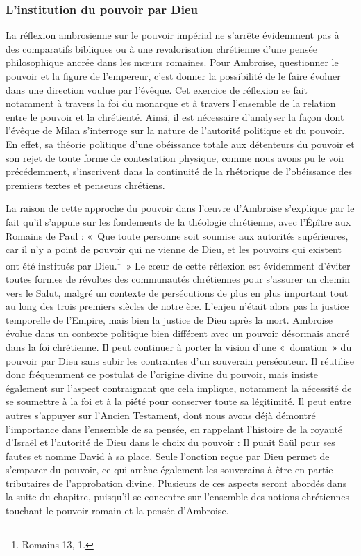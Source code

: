 \subsubsection{L'institution du pouvoir par Dieu}

La réflexion ambrosienne sur le pouvoir impérial ne s'arrête évidemment pas à des comparatifs bibliques ou à une revalorisation chrétienne d'une pensée philosophique ancrée dans les mœurs romaines. Pour Ambroise, questionner le pouvoir et la figure de l'empereur, c'est donner la possibilité de le faire évoluer dans une direction voulue par l'évêque. Cet exercice de réflexion se fait notamment à travers la foi du monarque et à travers l'ensemble de la relation entre le pouvoir et la chrétienté. Ainsi, il est nécessaire d'analyser la façon dont l'évêque de Milan s'interroge sur la nature de l'autorité politique et du pouvoir. En effet, sa théorie politique d'une obéissance totale aux détenteurs du pouvoir et son rejet de toute forme de contestation physique, comme nous avons pu le voir précédemment, s'inscrivent dans la continuité de la rhétorique de l'obéissance des premiers textes et penseurs chrétiens.

\bigskip

La raison de cette approche du pouvoir dans l'œuvre d'Ambroise s'explique par le fait qu'il s'appuie sur les fondements de la théologie chrétienne, avec l'Épître aux Romains de Paul : «~Que toute personne soit soumise aux autorités supérieures, car il n'y a point de pouvoir qui ne vienne de Dieu, et les pouvoirs qui existent ont été institués par Dieu.\footnote{Romains 13, 1.}~» Le cœur de cette réflexion est évidemment d'éviter toutes formes de révoltes des communautés chrétiennes pour s'assurer un chemin vers le Salut, malgré un contexte de persécutions de plus en plus important tout au long des trois premiers siècles de notre ère. L'enjeu n'était alors pas la justice temporelle de l'Empire, mais bien la justice de Dieu après la mort. Ambroise évolue dans un contexte politique bien différent avec un pouvoir désormais ancré dans la foi chrétienne. Il peut continuer à porter la vision d'une «~donation~» du pouvoir par Dieu sans subir les contraintes d'un souverain persécuteur. Il réutilise donc fréquemment ce postulat de l'origine divine du pouvoir, mais insiste également sur l'aspect contraignant que cela implique, notamment la nécessité de se soumettre à la foi et à la piété pour conserver toute sa légitimité. Il peut entre autres s'appuyer sur l'Ancien Testament, dont nous avons déjà démontré l'importance dans l'ensemble de sa pensée, en rappelant l'histoire de la royauté d'Israël et l'autorité de Dieu dans le choix du pouvoir : Il punit Saül pour ses fautes et nomme David à sa place. Seule l'onction reçue par Dieu permet de s'emparer du pouvoir, ce qui amène également les souverains à être en partie tributaires de l'approbation divine. Plusieurs de ces aspects seront abordés dans la suite du chapitre, puisqu'il se concentre sur l'ensemble des notions chrétiennes touchant le pouvoir romain et la pensée d'Ambroise.

